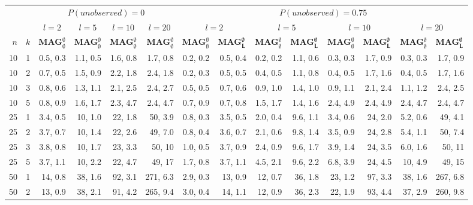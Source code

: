\begin{table}
  \begin{center}
  \scriptsize
  \begin{tabular}{|rr | r|r|r|r | rr|rr|rr|rr| }
  \hline && \multicolumn{4}{c|}{$P(unobserved) = 0$}& \multicolumn{8}{c|}{$P(unobserved) = 0.75$}\\
  \cline{3-14}
  && \multicolumn{1}{c|}{$l = 2$}&\multicolumn{1}{c|}{$l = 5$}&\multicolumn{1}{c|}{$l = 10$}&\multicolumn{1}{c|}{$l = 20$}&\multicolumn{2}{c|}{$l = 2$}&\multicolumn{2}{c|}{$l = 5$}&\multicolumn{2}{c|}{$l = 10$}&\multicolumn{2}{c|}{$l = 20$}
   \\
   \bfseries $n$ & \bfseries $k$ &\bfseries MAG$^\emptyset_\emptyset$&\bfseries MAG$^\emptyset_\emptyset$&\bfseries MAG$^\emptyset_\emptyset$&\bfseries MAG$^\emptyset_\emptyset$&\bfseries MAG$^\emptyset_\emptyset$&\bfseries MAG$^\emptyset_{\bf L}$&\bfseries MAG$^\emptyset_\emptyset$&\bfseries MAG$^\emptyset_{\bf L}$&\bfseries MAG$^\emptyset_\emptyset$&\bfseries MAG$^\emptyset_{\bf L}$&\bfseries MAG$^\emptyset_\emptyset$&\bfseries MAG$^\emptyset_{\bf L}$
\\\hline
10&1&
0.5, 0.3&1.1, 0.5&1.6, 0.8&1.7, 0.8&0.2, 0.2&0.5, 0.4&0.2, 0.2&1.1, 0.6&0.3, 0.3&1.7, 0.9&0.3, 0.3&1.7, 0.9\\
10&2&
0.7, 0.5&1.5, 0.9&2.2, 1.8&2.4, 1.8&0.2, 0.3&0.5, 0.5&0.4, 0.5&1.1, 0.8&0.4, 0.5&1.7, 1.6&0.4, 0.5&1.7, 1.6\\
10&3&
0.8, 0.6&1.3, 1.1&2.1, 2.5&2.4, 2.7&0.5, 0.5&0.7, 0.6&0.9, 1.0&1.4, 1.0&0.9, 1.1&2.1, 2.4&1.1, 1.2&2.4, 2.5\\
10&5&
0.8, 0.9&1.6, 1.7&2.3, 4.7&2.4, 4.7&0.7, 0.9&0.7, 0.8&1.5, 1.7&1.4, 1.6&2.4, 4.9&2.4, 4.9&2.4, 4.7&2.4, 4.7\\
\hline
25&1&
3.4, 0.5&10, 1.0&22, 1.8&50, 3.9&0.8, 0.3&3.5, 0.5&2.0, 0.4&9.6, 1.1&3.4, 0.6&24, 2.0&5.2, 0.6&49, 4.1\\
25&2&
3.7, 0.7&10, 1.4&22, 2.6&49, 7.0&0.8, 0.4&3.6, 0.7&2.1, 0.6&9.8, 1.4&3.5, 0.9&24, 2.8&5.4, 1.1&50, 7.4\\
25&3&
3.8, 0.8&10, 1.7&23, 3.3&50, 10&1.0, 0.5&3.7, 0.9&2.4, 0.9&9.6, 1.7&3.9, 1.4&24, 3.5&6.0, 1.6&50, 11\\
25&5&
3.7, 1.1&10, 2.2&22, 4.7&49, 17&1.7, 0.8&3.7, 1.1&4.5, 2.1&9.6, 2.2&6.8, 3.9&24, 4.5&10, 4.9&49, 15\\
\hline
50&1&
14, 0.8&38, 1.6&92, 3.1&271, 6.3&2.9, 0.3&13, 0.9&12, 0.7&36, 1.8&23, 1.2&97, 3.3&38, 1.6&267, 6.8\\
50&2&
13, 0.9&38, 2.1&91, 4.2&265, 9.4&3.0, 0.4&14, 1.1&12, 0.9&36, 2.3&22, 1.9&93, 4.4&37, 2.9&260, 9.8\\

\end{tabular}
\end{center}
\end{table}
